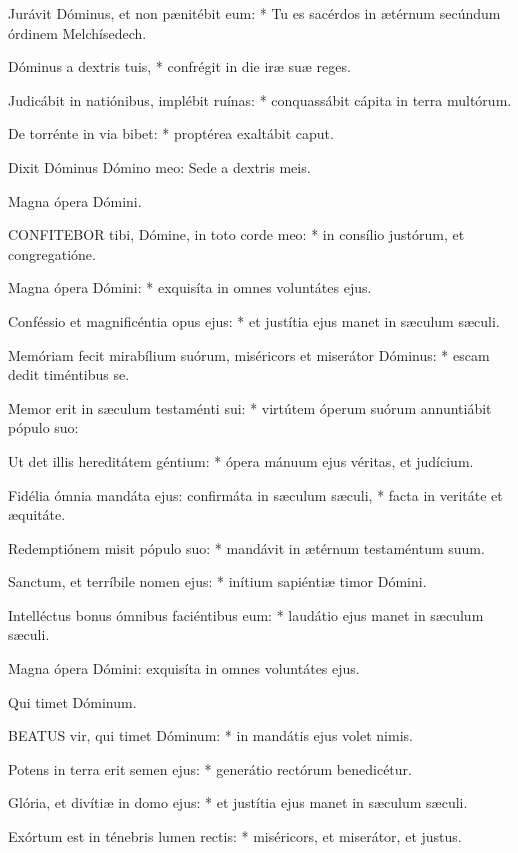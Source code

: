 Jurávit Dóminus, et non pænitébit eum: * Tu es sacérdos in ætérnum secúndum órdinem Melchísedech.

Dóminus a dextris tuis, * confrégit in die iræ suæ reges.

Judicábit in natiónibus, implébit ruínas: * conquassábit cápita in terra multórum.

De torrénte in via bibet: * proptérea exaltábit caput.

 Dixit Dóminus Dómino meo: Sede a dextris meis.

 Magna ópera Dómini.


\lettrine[lines=2]{C}{ONFITEBOR} tibi, Dómine, in toto corde meo: * in consílio justórum, et congregatióne.

Magna ópera Dómini: * exquisíta in omnes voluntátes ejus.

Conféssio et magnificéntia opus ejus: * et justítia ejus manet in sæculum sæculi.

Memóriam fecit mirabílium suórum, miséricors et miserátor Dóminus: * escam dedit timéntibus se.

Memor erit in sæculum testaménti sui: * virtútem óperum suórum annuntiábit pópulo suo:

Ut det illis hereditátem géntium: * ópera mánuum ejus véritas, et judícium.

Fidélia ómnia mandáta ejus: confirmáta in sæculum sæculi, * facta in veritáte et æquitáte.

Redemptiónem misit pópulo suo: * mandávit in ætérnum testaméntum suum.

Sanctum, et terríbile nomen ejus: * inítium sapiéntiæ timor Dómini.

Intelléctus bonus ómnibus faciéntibus eum: * laudátio ejus manet in sæculum sæculi.

 Magna ópera Dómini: exquisíta in omnes voluntátes ejus.

 Qui timet Dóminum.


\lettrine[lines=2]{B}{EATUS} vir, qui timet Dóminum: * in mandátis ejus volet nimis.

Potens in terra erit semen ejus: * generátio rectórum benedicétur.

Glória, et divítiæ in domo ejus: * et justítia ejus manet in sæculum sæculi.

Exórtum est in ténebris lumen rectis: * miséricors, et miserátor, et justus.

